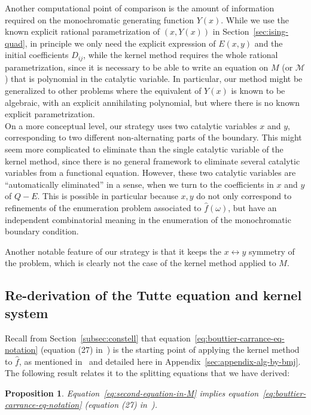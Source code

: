 \documentclass{scrartcl}
\newcommand\wh[1]{\widehat{#1}}
\newtheorem{prop}[thm]{Proposition}
\begin{document}
Another computational point of comparison is the amount of information required on the monochromatic generating function $Y(x)$. While we use the known explicit rational parametrization of $(x,Y(x))$ in Section~\ref{sec:ising-quad}, in principle we only need the explicit expression of $E(x,y)$ and the initial coefficients $D_{ij}$, while the kernel method requires the whole rational parametrization, since it is necessary to be able to  write an equation on $M$ (or $\mathcal{M}$) that is polynomial in the catalytic variable. In particular, our method might be generalized to other problems where the equivalent of $Y(x)$ is known to be algebraic, with an explicit annihilating polynomial, but where there is no known explicit parametrization.\\

On a more conceptual level, our strategy uses two catalytic variables $x$ and $y$, corresponding to two different non-alternating parts of the boundary. This might seem more complicated to eliminate than the single catalytic variable of the kernel method, since there is no general framework to eliminate several catalytic variables from a functional equation. However, these two catalytic variables are ``automatically eliminated'' in a sense, when we turn to the coefficients in $x$ and $y$ of $Q-E$. This is possible in particular because $x,y$ do not only correspond to refinements of the enumeration problem associated to $\wh{f}(\omega)$, but have an independent combinatorial meaning in the enumeration of the monochromatic boundary condition.

Another notable feature of our strategy is that it keeps the $x\leftrightarrow y$ symmetry of the problem, which is clearly not the case of the kernel method applied to $M$.

\subsection{Re-derivation of the Tutte equation and kernel system}
\label{sec:bouttier-carrance-eq-rederived}

 
Recall from Section~\ref{subsec:constell} that equation~\eqref{eq:bouttier-carrance-eq-notation} (equation (27) in~\cite{bouttier-carrance})  is the starting point of applying the kernel method to $\wh{f}$, as mentioned in~\cite{bouttier-carrance} and detailed here in Appendix~\ref{sec:appendix-alg-by-bmj}. The following result relates it to the splitting equations that we have derived:

\begin{prop}
Equation~\eqref{eq:second-equation-in-M} implies equation~\eqref{eq:bouttier-carrance-eq-notation} (equation (27) in~\cite{bouttier-carrance}).
\label{prop:tutte-bc-from-splitting}
\end{prop}
\end{document}
